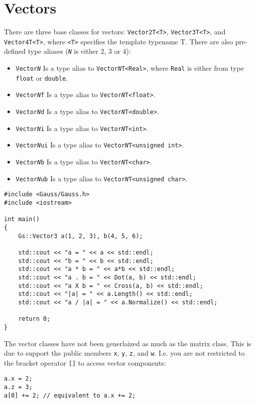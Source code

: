 \documentclass{article}
\begin{document}

\section*{Vectors}

There are three base classes for vectors: \texttt{Vector2T<T>}, \texttt{Vector3T<T>}, and \texttt{Vector4T<T>},
where \texttt{<T>} specifies the template typename T. There are also pre-defined type aliases
(\texttt{\textit{N}} is either 2, 3 or 4):
\begin{itemize}
	\item \texttt{Vector\textit{N}} Is a type alias to \texttt{Vector\textit{N}T<Real>}, where \texttt{Real} is either
		from type \texttt{float} or \texttt{double}.
	\item \texttt{Vector\textit{N}f} Is a type alias to \texttt{Vector\textit{N}T<float>}.
	\item \texttt{Vector\textit{N}d} Is a type alias to \texttt{Vector\textit{N}T<double>}.
	\item \texttt{Vector\textit{N}i} Is a type alias to \texttt{Vector\textit{N}T<int>}.
	\item \texttt{Vector\textit{N}ui} Is a type alias to \texttt{Vector\textit{N}T<unsigned int>}.
	\item \texttt{Vector\textit{N}b} Is a type alias to \texttt{Vector\textit{N}T<char>}.
	\item \texttt{Vector\textit{N}ub} Is a type alias to \texttt{Vector\textit{N}T<unsigned char>}.
\end{itemize}

\begin{lstlisting}
#include <Gauss/Gauss.h>
#include <iostream>

int main()
{
	Gs::Vector3 a(1, 2, 3), b(4, 5, 6);
	
	std::cout << "a = " << a << std::endl;
	std::cout << "b = " << b << std::endl;
	std::cout << "a * b = " << a*b << std::endl;
	std::cout << "a . b = " << Dot(a, b) << std::endl;
	std::cout << "a X b = " << Cross(a, b) << std::endl;
	std::cout << "|a| = " << a.Length() << std::endl;
	std::cout << "a / |a| = " << a.Normalize() << std::endl;
	
	return 0;
}
\end{lstlisting}
The vector classes have not been generlaized as much as the matrix class. This is due to support the public members
\texttt{x}, \texttt{y}, \texttt{z}, and \texttt{w}. I.e. you are not restricted to the bracket operator \texttt{[]}
to access vector components:
\begin{lstlisting}
a.x = 2;
a.z = 3;
a[0] += 2; // equivalent to a.x += 2;
\end{lstlisting}
\end{document}
